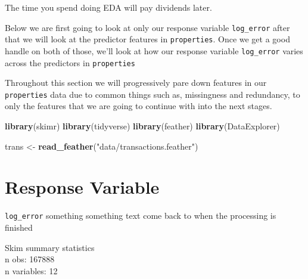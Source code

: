 \documentclass[]{book}
\newenvironment{Shaded}{\begin{snugshade}}{\end{snugshade}}
\newcommand{\KeywordTok}[1]{\textcolor[rgb]{0.13,0.29,0.53}{\textbf{#1}}}
\newcommand{\StringTok}[1]{\textcolor[rgb]{0.31,0.60,0.02}{#1}}
\newcommand{\OperatorTok}[1]{\textcolor[rgb]{0.81,0.36,0.00}{\textbf{#1}}}
\newcommand{\NormalTok}[1]{#1}
\theoremstyle{definition}
\theoremstyle{definition}
\theoremstyle{definition}
\theoremstyle{remark}
\begin{document}
The time you spend doing EDA will pay dividends later.

Below we are first going to look at only our response variable
\texttt{log\_error} after that we will look at the predictor features in
\texttt{properties}. Once we get a good handle on both of those, we'll
look at how our response variable \texttt{log\_error} varies across the
predictors in \texttt{properties}

Throughout this section we will progressively pare down features in our
\texttt{properties} data due to common things such as, missingness and
redundancy, to only the features that we are going to continue with into
the next stages.

\begin{Shaded}
\begin{Highlighting}[]
\KeywordTok{library}\NormalTok{(skimr)}
\KeywordTok{library}\NormalTok{(tidyverse)}
\KeywordTok{library}\NormalTok{(feather)}
\KeywordTok{library}\NormalTok{(DataExplorer)}

\NormalTok{trans <-}\StringTok{ }\KeywordTok{read_feather}\NormalTok{(}\StringTok{"data/transactions.feather"}\NormalTok{)}
\end{Highlighting}
\end{Shaded}

\section{Response Variable}\label{response-variable}

\texttt{log\_error} something something text come back to when the
processing is finished

\begin{Shaded}
\end{Shaded}

Skim summary statistics\\
n obs: 167888\\
n variables: 12
\end{document}
